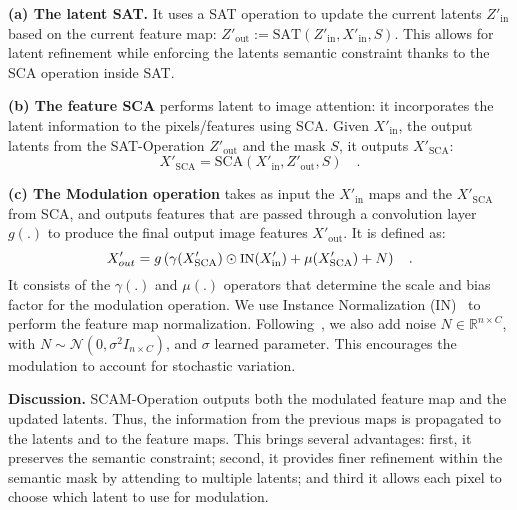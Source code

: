 \documentclass[runningheads]{llncs}
\begin{document}
\noindent \textbf{(a) The latent SAT.} It uses a SAT operation to update the current latents   $Z'_{\text{in}}$ based on the current feature map: 
$Z'_{\text{out}}{:=} \text{SAT}(Z'_{\text{in}},X'_{\text{in}},S)$. 
This allows for latent refinement while enforcing the latents semantic constraint thanks to the SCA operation inside SAT.

\noindent \textbf{(b) The feature SCA} performs latent to image attention: it incorporates the latent information to the pixels/features  using SCA. Given $X'_{\text{in}}$, the output latents from the SAT-Operation $Z'_{\text{out}}$ and the mask $S$, it outputs  $X'_{\text{SCA}}$:
\begin{equation}
    X'_{\text{SCA}} = \text{SCA}(X'_{\text{in}},Z'_{\text{out}},S) \quad .
\end{equation}

\noindent \textbf{(c) The Modulation operation} takes as input the $X'_{\text{in}}$ maps and the  $X'_{\text{SCA}}$ from SCA, and outputs features that are passed through a convolution layer $g(.)$ to produce the final output image features $X'_{\text{out}}$.  It is defined as:
\begin{equation}
\begin{small}
    X'_{out} =g\left(\gamma(X'_{\text{SCA}})\odot \text{IN}(X'_{\text{in}}) + \mu(X'_{\text{SCA}}) + N\right) \quad .
    \end{small}
\end{equation}
It consists of the $\gamma(.)$ and $\mu(.)$ operators that determine the scale and bias factor for the modulation operation. 
We use Instance Normalization (IN)~\cite{ulyanov2017instance} to perform the feature map normalization. 
Following~\cite{karras2019stylebased,karras2020analyzing}, we also add noise $N {\in} \mathbb{R}^{n \times C}$, with $N {\sim}\mathcal{N}(0,\sigma^2 I_{n \times C})$, and $\sigma$ learned parameter. This encourages the modulation to account for stochastic variation.



\noindent \textbf{Discussion.} SCAM-Operation outputs both the modulated feature map and the updated latents. Thus, the information from the previous maps is propagated to the latents and to the feature maps. This brings several advantages: 
first, it preserves the semantic constraint; 
second, it provides finer refinement within the semantic mask by attending to multiple latents; and 
third it allows each pixel to choose which latent to use for modulation.
\end{document}
